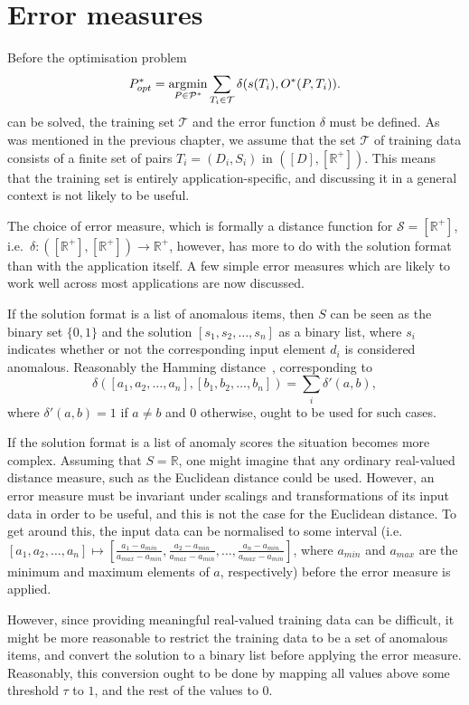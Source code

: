 \section{Error measures}

Before the optimisation problem
\[
    P^*_{opt} = \argmin_{P \in \mathcal{P}^*} \sum_{T_i \in \mathcal{T}} \delta(s(T_i), O^*(P, T_i)).
\]
can be solved, the training set $\mathcal{T}$ and the error function $\delta$ must be defined. As was mentioned in the previous chapter, we assume that the set $\mathcal{T}$ of training data consists of a finite set of pairs $T_i = (D_i, S_i)$ in $([D], [\mathbb{R}^+])$. This means that the training set is entirely application-specific, and discussing it in a general context is not likely to be useful.

The choice of error measure, which is formally a distance function for $\mathcal{S} = [\mathbb{R}^+]$, i.e.\ $\delta: ([\mathbb{R}^+], [\mathbb{R}^+]) \rightarrow \mathbb{R}^+$, however, has more to do with the solution format than with the application itself. A few simple error measures which are likely to work well across most applications are now discussed.

If the solution format is a list of anomalous items, then $S$ can be seen as the binary set $\{0, 1\}$ and the solution $[s_1, s_2, \dots, s_n]$ as a binary list, where $s_i$ indicates whether or not the corresponding input element $d_i$ is considered anomalous. Reasonably the Hamming distance~\cite{TODO}, corresponding to
\[
    \delta([a_1, a_2, \dots, a_n], [b_1, b_2, \dots, b_n]) = \sum_i \delta'(a, b),
\]
where $\delta'(a, b) = 1$ if $a \neq b$ and $0$ otherwise, ought to be used for such cases.

If the solution format is a list of anomaly scores the situation becomes more complex. Assuming that $S = \mathbb{R}$, one might imagine that any ordinary real-valued distance measure, such as the Euclidean distance could be used. However, an error measure must be invariant under scalings and transformations of its input data in order to be useful, and this is not the case for the Euclidean distance. To get around this, the input data can be normalised to some interval (i.e.\ $[a_1, a_2, \dots, a_n] \mapsto [\frac{a_1 - a_{min}}{a_{max} - a_{min}}, \frac{a_2 - a_{min}}{a_{max} - a_{min}}, \dots, \frac{a_n - a_{min}}{a_{max} - a_{min}}]$, where $a_{min}$ and $a_{max}$ are the minimum and maximum elements of $a$, respectively) before the error measure is applied.

However, since providing meaningful real-valued training data can be difficult, it might be more reasonable to restrict the training data to be a set of anomalous items, and convert the solution to a binary list before applying the error measure. Reasonably, this conversion ought to be done by mapping all values above some threshold $\tau$ to $1$, and the rest of the values to $0$.

